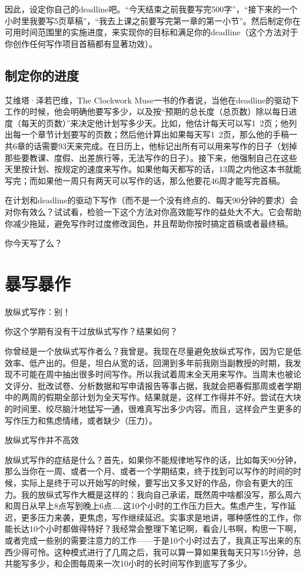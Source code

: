 \documentclass{ctexart}
\begin{document}
因此，设定你自己的deadline吧。“今天结束之前我要写完500字”，“接下来的一个小时里我要写5页草稿”，“我去上课之前要写完第一章的第一小节”。然后制定你在可用时间范围里的实施进度，来实现你的目标和满足你的deadline（这个方法对于你创作任何写作项目首稿都有显著功效）。

\subsection{制定你的进度}

艾维塔·泽若巴维，The Clockwork Muse一书的作者说，当他在deadline的驱动下工作的时候，他会明确他要写多少，以及按“预期的总长度（总页数）除以每日进度（每天的页数）”来决定他计划写多少天。比如，他估计每天可以写1~2页；他列出每一个章节计划要写的页数；然后他计算出如果每天写1~2页，那么他的手稿一共6章的话需要93天来完成。在日历上，他标记出所有可以用来写作的日子（划掉那些要教课、度假、出差旅行等，无法写作的日子）。接下来，他强制自己在这些天里按计划、按规定的速度来写作。如果他每天都写的话，13周之内他这本书就能写完；而如果他一周只有两天可以写作的话，那么他要花46周才能写完首稿。

在计划和deadline的驱动下写作（而不是一个没有终点的、每天90分钟的要求）会对你有效么？试试看，检验一下这个方法对你高效能写作的益处大不大。它会帮助你减少拖延，避免写作时过度修改润色，并且帮助你按时搞定首稿或者最终稿。

你今天写了么？

\section{暴写暴作}
放纵式写作：别！

你这个学期有没有干过放纵式写作？结果如何？

你曾经是一个放纵式写作者么？我曾是。我现在尽量避免放纵式写作，因为它是低效率、低产出的。但是，坦白从宽的话，回溯到多年前我刚当副教授的时期，我发现不可能在周中抽出很多时间写作。所以我试着周末全天用来写作。当周末也被论文评分、批改试卷、分析数据和写申请报告等事占据，我就会把春假那周或者学期中的两周的假期全部计划为全天写作。结果就是，这样工作得并不好。尝试在大块的时间里、绞尽脑汁地猛写一通，很难真写出多少内容。而且，这样会产生更多的写作压力和焦虑情绪，或者缺少（压力）。

放纵式写作并不高效

放纵式写作的症结是什么？首先，如果你不能规律地写作的话，比如每天90分钟，那么当你在一周、或者一个月、或者一个学期结束，终于找到可以写作的时间的时候，实际上是终于可以开始写的时候，要写出又多又好的作品，你会有更大的压力。我的放纵式写作大概是这样的：我向自己承诺，既然周中啥都没写，那么周六和周日从早上8点写到晚上6点……这10个小时的工作压力巨大。焦虑产生，写作延迟，更多压力来袭，更焦虑，写作继续延迟。实事求是地讲，哪种感性的工作，你能长达10个小时都做得特好？我经常会整理下笔记啊，看会儿书啊，构思一下啊，或者完成一些别的需要注意力的工作——于是10个小时过去了，我真正写出来的东西少得可怜。这种模式进行了几周之后，我可以算一算如果我每天只写15分钟，总共能写多少，和企图每周来一次10小时的长时间写作到底写了多少。
\end{document}
